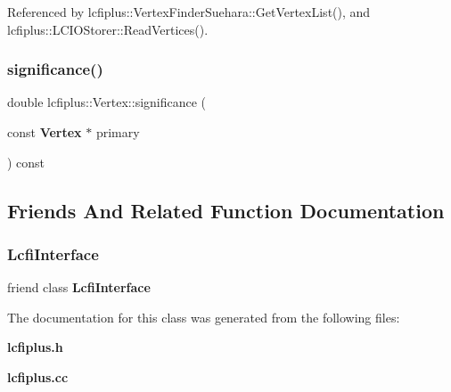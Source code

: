 Referenced by lcfiplus\+::\+Vertex\+Finder\+Suehara\+::\+Get\+Vertex\+List(), and lcfiplus\+::\+L\+C\+I\+O\+Storer\+::\+Read\+Vertices().

\mbox{\label{classlcfiplus_1_1Vertex_a918e45a47b2a41f4f14b215445ab547d}} 
\subsubsection{significance()}
{\footnotesize\ttfamily double lcfiplus\+::\+Vertex\+::significance (\begin{DoxyParamCaption}\item[{const \textbf{ Vertex} $\ast$}]{primary }\end{DoxyParamCaption}) const}



\subsection{Friends And Related Function Documentation}
\mbox{\label{classlcfiplus_1_1Vertex_accab27529b30dc40f1d8ddef17b413d9}} 
\subsubsection{Lcfi\+Interface}
{\footnotesize\ttfamily friend class \textbf{ Lcfi\+Interface}\hspace{0.3cm}{\ttfamily [friend]}}



The documentation for this class was generated from the following files\+:\begin{DoxyCompactItemize}
\item 
\textbf{ lcfiplus.\+h}\item 
\textbf{ lcfiplus.\+cc}\end{DoxyCompactItemize}

